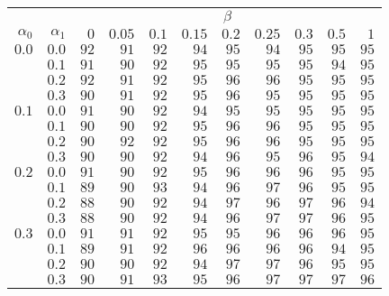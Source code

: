 \begin{tabular}{rr|rrrrrrrrr}
\hline\hline
 && \multicolumn{9}{c}{$\beta$}\\
 $\alpha_0$ & $\alpha_1$ & $0$ & $0.05$ & $0.1$ & $0.15$ & $0.2$ & $0.25$ & $0.3$ & $0.5$ & $1$ \\ 
 \hline
$0.0$ & $0.0$ & $92$ & $91$ & $92$ & $94$ & $95$ & $94$ & $95$ & $95$ & $95$\\ 
 & $0.1$ & $91$ & $90$ & $92$ & $95$ & $95$ & $95$ & $95$ & $94$ & $95$\\ 
 & $0.2$ & $92$ & $91$ & $92$ & $95$ & $96$ & $96$ & $95$ & $95$ & $95$\\ 
 & $0.3$ & $90$ & $91$ & $92$ & $95$ & $96$ & $95$ & $95$ & $95$ & $95$\\ 
\hline 
 $0.1$ & $0.0$ & $91$ & $90$ & $92$ & $94$ & $95$ & $95$ & $95$ & $95$ & $95$\\ 
 & $0.1$ & $90$ & $90$ & $92$ & $95$ & $96$ & $96$ & $95$ & $95$ & $95$\\ 
 & $0.2$ & $90$ & $92$ & $92$ & $95$ & $96$ & $96$ & $95$ & $95$ & $95$\\ 
 & $0.3$ & $90$ & $90$ & $92$ & $94$ & $96$ & $95$ & $96$ & $95$ & $94$\\ 
\hline 
 $0.2$ & $0.0$ & $91$ & $90$ & $92$ & $95$ & $96$ & $96$ & $96$ & $95$ & $95$\\ 
 & $0.1$ & $89$ & $90$ & $93$ & $94$ & $96$ & $97$ & $96$ & $95$ & $95$\\ 
 & $0.2$ & $88$ & $90$ & $92$ & $94$ & $97$ & $96$ & $97$ & $96$ & $94$\\ 
 & $0.3$ & $88$ & $90$ & $92$ & $94$ & $96$ & $97$ & $97$ & $96$ & $95$\\ 
\hline 
 $0.3$ & $0.0$ & $91$ & $91$ & $92$ & $95$ & $95$ & $96$ & $96$ & $96$ & $95$\\ 
 & $0.1$ & $89$ & $91$ & $92$ & $96$ & $96$ & $96$ & $96$ & $94$ & $95$\\ 
 & $0.2$ & $90$ & $90$ & $92$ & $94$ & $97$ & $97$ & $96$ & $95$ & $95$\\ 
 & $0.3$ & $90$ & $91$ & $93$ & $95$ & $96$ & $97$ & $97$ & $97$ & $96$\\ 
 \hline 
 \end{tabular}